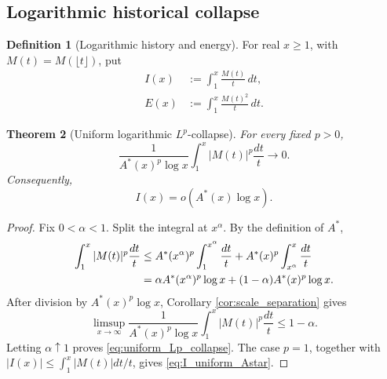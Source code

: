 \documentclass[11pt]{amsart}
\numberwithin{equation}{section}
\theoremstyle{plain}
\newtheorem{theorem}{Theorem}[section]
\theoremstyle{definition}
\newtheorem{definition}[theorem]{Definition}
\theoremstyle{remark}
\begin{document}
\subsection{Logarithmic historical collapse}
\label{subsec:log_history_collapse}

\begin{definition}[Logarithmic history and energy]
\label{def:I_E}
For real \(x\ge1\), with \(M(t)=M(\lfloor t\rfloor)\), put
\begin{align}
I(x)&:=\int_1^x\frac{M(t)}{t}\,dt,
\label{eq:mertens_I_definition}\\
E(x)&:=\int_1^x\frac{M(t)^2}{t}\,dt.
\label{eq:E_definition}
\end{align}
\end{definition}

\begin{theorem}[Uniform logarithmic \(L^p\)-collapse]
\label{thm:uniform_Lp_collapse}
For every fixed \(p>0\),
\begin{equation}
\boxed{
\frac1{A^*(x)^p\log x}
\int_1^x|M(t)|^p\frac{dt}{t}
\longrightarrow0.}
\label{eq:uniform_Lp_collapse}
\end{equation}
Consequently,
\begin{equation}
\boxed{I(x)=o(A^*(x)\log x).}
\label{eq:I_uniform_Astar}
\end{equation}
\end{theorem}

\begin{proof}
Fix \(0<\alpha<1\).  Split the integral at \(x^\alpha\).  By the definition
of \(A^*\),
\begin{align}
\int_1^x|M(t)|^p\frac{dt}{t}
&\le
A^*(x^\alpha)^p\int_1^{x^\alpha}\frac{dt}{t}
+A^*(x)^p\int_{x^\alpha}^{x}\frac{dt}{t}
\notag\\
&=
\alpha A^*(x^\alpha)^p\log x
+(1-\alpha)A^*(x)^p\log x.
\label{eq:Lp_cutoff_bound}
\end{align}
After division by \(A^*(x)^p\log x\), Corollary
\ref{cor:scale_separation} gives
\begin{equation}
\limsup_{x\to\infty}
\frac1{A^*(x)^p\log x}
\int_1^x|M(t)|^p\frac{dt}{t}
\le1-\alpha.
\label{eq:Lp_limsup_alpha}
\end{equation}
Letting \(\alpha\uparrow1\) proves \eqref{eq:uniform_Lp_collapse}.  The
case \(p=1\), together with
\(|I(x)|\le\int_1^x|M(t)|dt/t\), gives \eqref{eq:I_uniform_Astar}.
\end{proof}
\end{document}
